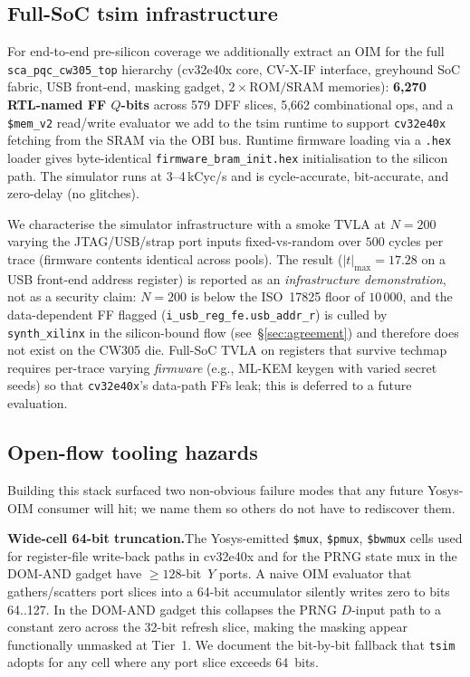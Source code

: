 \subsection{Full-SoC tsim infrastructure}
\label{sec:fullsoc}

For end-to-end pre-silicon coverage we additionally extract an OIM for the
full \texttt{sca\_pqc\_cw305\_top} hierarchy (cv32e40x core, CV-X-IF
interface, greyhound SoC fabric, USB front-end, masking gadget,
$2 \times \mathrm{ROM/SRAM}$ memories): \textbf{6{,}270 RTL-named FF
$Q$-bits} across 579 DFF slices, 5{,}662 combinational ops, and a
\texttt{\$mem\_v2} read/write evaluator we add to the tsim runtime to
support \texttt{cv32e40x} fetching from the SRAM via the OBI bus.  Runtime
firmware loading via a \texttt{.hex} loader gives byte-identical
\texttt{firmware\_bram\_init.hex} initialisation to the silicon path.
The simulator runs at 3--4\,kCyc/s and is cycle-accurate, bit-accurate, and
zero-delay (no glitches).

We characterise the simulator infrastructure with a smoke TVLA at $N{=}200$
varying the JTAG/USB/strap port inputs fixed-vs-random over $500$ cycles per
trace (firmware contents identical across pools).  The result
($|t|_\mathrm{max} = 17.28$ on a USB front-end address register) is reported
as an \emph{infrastructure demonstration}, not as a security claim: $N{=}200$
is below the ISO~17825 floor of $10\,000$, and the data-dependent FF flagged
(\texttt{i\_usb\_reg\_fe.usb\_addr\_r}) is culled by \texttt{synth\_xilinx}
in the silicon-bound flow (see~\S\ref{sec:agreement}) and therefore does not
exist on the CW305 die.  Full-SoC TVLA on registers that survive techmap
requires per-trace varying \emph{firmware} (e.g., ML-KEM keygen with varied
secret seeds) so that \texttt{cv32e40x}'s data-path FFs leak; this is
deferred to a future evaluation.

\subsection{Open-flow tooling hazards}
\label{sec:hazards}

Building this stack surfaced two non-obvious failure modes that any future
Yosys-OIM consumer will hit; we name them so others do not have to rediscover
them.

\textbf{Wide-cell 64-bit truncation.}\quad The Yosys-emitted
\texttt{\$mux}, \texttt{\$pmux}, \texttt{\$bwmux} cells used for
register-file write-back paths in cv32e40x and for the PRNG state mux in the
DOM-AND gadget have $\geq{}128$-bit~$Y$ ports.  A naive OIM evaluator that
gathers/scatters port slices into a 64-bit accumulator silently writes zero
to bits 64..127.  In the DOM-AND gadget this collapses the PRNG $D$-input
path to a constant zero across the 32-bit refresh slice, making the masking
appear functionally unmasked at Tier~1.  We document the bit-by-bit
fallback that \texttt{tsim} adopts for any cell where any port slice
exceeds 64~bits.

